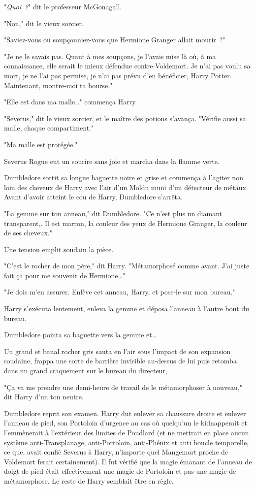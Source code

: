 "\emph{Quoi~?}" dit le professeur McGonagall.

"Non," dit le vieux sorcier.

"Saviez-vous ou soupçonniez-vous que Hermione Granger allait mourir~?"

"Je ne le savais pas. Quant à mes soupçons, je l'avais mise là où, à ma connaissance, elle serait le mieux défendue contre Voldemort. Je n'ai pas voulu sa mort, je ne l'ai pas permise, je n'ai pas prévu d'en bénéficier, Harry Potter. Maintenant, montre-moi ta bourse."

"Elle est dans ma malle…" commença Harry.

"Severus," dit le vieux sorcier, et le maître des potions s'avança. "Vérifie aussi sa malle, chaque compartiment."

"Ma malle est protégée."

Severus Rogue eut un sourire sans joie et marcha dans la flamme verte.

Dumbledore sortit sa longue baguette noire et grise et commença à l'agiter non loin des cheveux de Harry avec l'air d'un Moldu muni d'un détecteur de métaux. Avant d'avoir atteint le cou de Harry, Dumbledore s'arrêta.

"La gemme sur ton anneau," dit Dumbledore. "Ce n'est plus un diamant transparent,. Il est marron, la couleur des yeux de Hermione Granger, la couleur de ses cheveux."

Une tension emplit soudain la pièce.

"C'est le rocher de mon père," dit Harry. "Métamorphosé comme avant. J'ai juste fait ça pour me souvenir de Hermione…"

"Je dois m'en assurer. Enlève cet anneau, Harry, et pose-le sur mon bureau."

Harry s'exécuta lentement, enleva la gemme et déposa l'anneau à l'autre bout du bureau.

Dumbledore pointa sa baguette vers la gemme et…

Un grand et banal rocher gris sauta en l'air sous l'impact de son expansion soudaine, frappa une sorte de barrière invisible au-dessus de lui puis retomba dans un grand craquement sur le bureau du directeur,

"Ça va me prendre une demi-heure de travail de le métamorphoser à nouveau," dit Harry d'un ton neutre.

Dumbledore reprit son examen. Harry dut enlever sa chaussure droite et enlever l'anneau de pied, son Portoloin d'urgence au cas où quelqu'un le kidnapperait et l'emmènerait à l'extérieur des limites de Poudlard (et ne mettrait en place aucun système anti-Transplanage, anti-Portoloin, anti-Phénix et anti boucle temporelle, ce que, avait confié Severus à Harry, n'importe quel Mangemort proche de Voldemort ferait certainement). Il fut vérifié que la magie émanant de l'anneau de doigt de pied était effectivement une magie de Portoloin et pas une magie de métamorphose. Le reste de Harry semblait être en règle.

